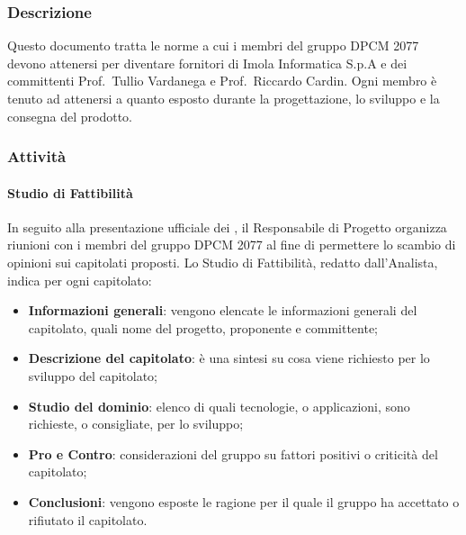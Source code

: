 		\subsubsection{Descrizione}
		Questo documento tratta le norme a cui i membri del gruppo DPCM 2077 devono attenersi per diventare fornitori di Imola Informatica S.p.A e dei committenti Prof.~Tullio Vardanega e Prof.~Riccardo Cardin. Ogni membro è tenuto ad attenersi a quanto esposto durante la progettazione, lo sviluppo e la consegna del prodotto.
		\subsubsection{Attività}
			\paragraph{Studio di Fattibilità}
			In seguito alla presentazione ufficiale dei , il Responsabile di Progetto organizza riunioni con i membri del gruppo DPCM 2077 al fine di permettere lo scambio di opinioni sui capitolati proposti. Lo Studio di Fattibilità, redatto dall'Analista, indica per ogni capitolato:
			\begin{itemize}
				\item \textbf{Informazioni generali}: vengono elencate le informazioni generali del capitolato, quali nome del progetto, proponente e committente;
				\item \textbf{Descrizione del capitolato}: è una sintesi su cosa viene richiesto per lo sviluppo del capitolato;
				\item \textbf{Studio del dominio}: elenco di quali tecnologie, o applicazioni, sono richieste, o consigliate, per lo sviluppo;
				\item \textbf{Pro e Contro}: considerazioni del gruppo su fattori positivi o criticità del capitolato;
				\item \textbf{Conclusioni}: vengono esposte le ragione per il quale il gruppo ha accettato o rifiutato il capitolato.
			\end{itemize}
